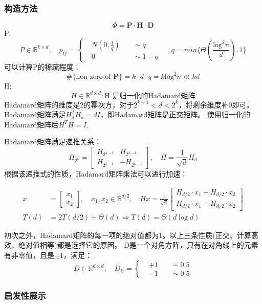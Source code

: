 \documentclass[lang=cn,newtx,10pt,scheme=chinese,chinesefont=nofont,citestyle=gb7714-2015, bibstyle=gb7714-2015]{elegantbook}
\begin{document}
\begin{refsection}
\subsubsection{构造方法}
$$
\Phi = \mathbf{P}\cdot \mathbf{H}\cdot \mathbf{D}
$$
P:
$$
P \in \mathbb{R}^{k\times d},\quad
p_{ij}=\left\{
	\begin{aligned}
		&N(0,\frac 1 q)&\quad\sim q\\
		&0 &\quad\sim 1-q
	\end{aligned}
\right.
\quad
,q = min\{\Theta(\frac{\mathrm{log}^2n}{d}),1\}
$$
可以计算P的稀疏程度：
$$
\#\{\text{non-zero of }\mathbf{P}\} = k\cdot d \cdot q = k \mathrm{log}^2n \ll kd
$$
H:
$$
H \in \mathbb{R}^{d\times d}:\text{H 是归一化的Hadamard矩阵}
$$
Hadamard矩阵的维度是2的幂次方，对于$2^{k-1}<d<2^k$，将剩余维度补0即可。Hadamard矩阵满足$H_d^TH_d=dI$，即Hadamard矩阵是正交矩阵。
使用归一化的Hadamard矩阵后$H^TH=I$.

Hadamard矩阵满足递推关系：
$$
H_{2^k} = \begin{bmatrix}
	H_{2^{k-1}} & H_{2^{k-1}}\\
	H_{2^{k-1}} & -H_{2^{k-1}}
\end{bmatrix},\quad H = \frac 1 {\sqrt{d}}H_{d}
$$
根据该递推式的性质，Hadamard矩阵乘法可以进行加速：

$$
\begin{aligned}
	x&=\begin{bmatrix}
		x_1\\
		x_2
	\end{bmatrix},\quad
	x_1,x_2\in \mathbb{R}^{d/2},\quad
	Hx=\frac{1}{\sqrt{d}}\begin{bmatrix}
		H_{d/2}\cdot x_1 + H_{d/2}\cdot x_2\\
		H_{d/2}\cdot x_1 - H_{d/2}\cdot x_2
		\end{bmatrix}\\
	T(d) &= 2T(d/2)+\Theta(d)\Rightarrow T(d) = \Theta(d\log d)
\end{aligned}
$$

初次之外，Hadamard矩阵的每一项的绝对值都为1。以上三条性质(正交、计算高效、绝对值相等)都是选择它的原因。
D是一个对角方阵，只有在对角线上的元素有非零值，且是$\pm 1$，满足：
$$
D\in \mathbb{R}^{d\times d},\quad
D_{ii} = \left\{
	\begin{aligned}
		&+1&\quad\sim 0.5\\
		&-1 &\quad\sim 0.5
	\end{aligned}
\right.
$$

\subsubsection{启发性展示}


\end{refsection}
\end{document}
